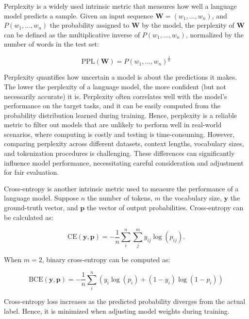 Perplexity is a widely used intrinsic metric that measures how well a language model predicts a sample. Given an input sequence $\bm{W} = (w_1, \ldots, w_n)$, and $P(w_1, \ldots, w_n)$ the probability assigned to $\bm{W}$ by the model, the perplexity of $\bm{W}$ can be defined as the multiplicative inverse of $P(w_1, \ldots, w_n)$, normalized by the number of words in the test set:

\begin{equation}
    \text{PPL}(\bm{W}) = P(w_1, \ldots, w_n)^{\frac{1}{n}}
\end{equation}

Perplexity quantifies how uncertain a model is about the predictions it makes. The lower the perplexity of a language model, the more confident (but not necessarily accurate) it is. Perplexity often correlates well with the model's performance on the target tasks, and it can be easily computed from the probability distribution learned during training. Hence, perplexity is a reliable metric to filter out models that are unlikely to perform well in real-world scenarios, where computing is costly and testing is time-consuming. However, comparing perplexity across different datasets, context lengths, vocabulary sizes, and tokenization procedures is challenging. These differences can significantly influence model performance, necessitating careful consideration and adjustment for fair evaluation.

Cross-entropy is another intrinsic metric used to measure the performance of a language model. Suppose $n$ the number of tokens, $m$ the vocabulary size, $\bm{y}$ the ground-truth vector, and $\bm{p}$ the vector of output probabilities. Cross-entropy can be calculated as:

\begin{equation}
    \text{CE}(\bm{y}, \bm{p}) = - \dfrac{1}{n} \sum_{i}^n \sum_{j}^m y_{ij} \log (p_{ij}).
\end{equation}

\noindent When $m = 2$, binary cross-entropy can be computed as:

\begin{equation}
    \text{BCE}(\bm{y}, \bm{p}) = - \dfrac{1}{n} \sum_{i}^n (y_i \log(p_i) + (1-y_i) \log (1-p_i))
\end{equation}

\noindent Cross-entropy loss increases as the predicted probability diverges from the actual label. Hence, it is minimized when adjusting model weights during training. 

